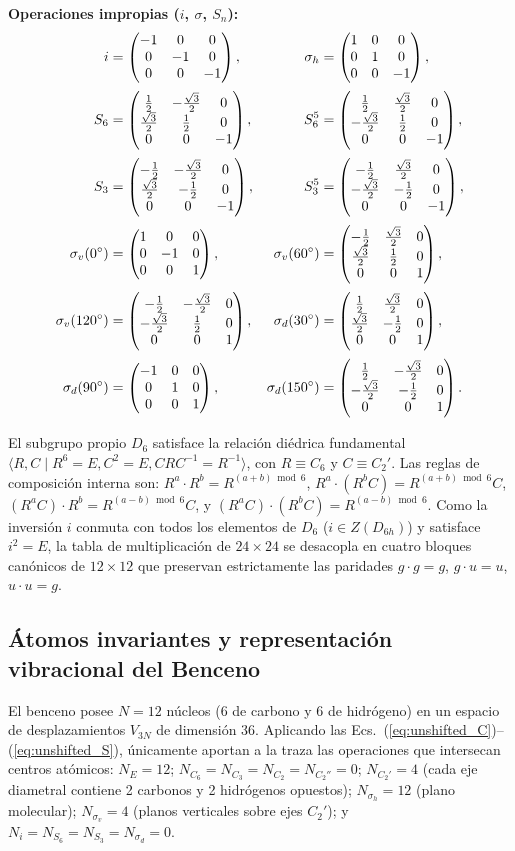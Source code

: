 \noindent\textbf{Operaciones impropias ($i$, $\sigma$, $S_n$):}
\begin{align*}
i &= \begin{pmatrix}-1&0&0\\0&-1&0\\0&0&-1\end{pmatrix}, &
\sigma_h &= \begin{pmatrix}1&0&0\\0&1&0\\0&0&-1\end{pmatrix}, \\[2pt]
S_6 &= \begin{pmatrix}\tfrac{1}{2}&-\tfrac{\sqrt{3}}{2}&0\\\tfrac{\sqrt{3}}{2}&\tfrac{1}{2}&0\\0&0&-1\end{pmatrix}, &
S_6^{5} &= \begin{pmatrix}\tfrac{1}{2}&\tfrac{\sqrt{3}}{2}&0\\-\tfrac{\sqrt{3}}{2}&\tfrac{1}{2}&0\\0&0&-1\end{pmatrix}, \\[2pt]
S_3 &= \begin{pmatrix}-\tfrac{1}{2}&-\tfrac{\sqrt{3}}{2}&0\\\tfrac{\sqrt{3}}{2}&-\tfrac{1}{2}&0\\0&0&-1\end{pmatrix}, &
S_3^{5} &= \begin{pmatrix}-\tfrac{1}{2}&\tfrac{\sqrt{3}}{2}&0\\-\tfrac{\sqrt{3}}{2}&-\tfrac{1}{2}&0\\0&0&-1\end{pmatrix}, \\[2pt]
\sigma_v(0^\circ) &= \begin{pmatrix}1&0&0\\0&-1&0\\0&0&1\end{pmatrix}, &
\sigma_v(60^\circ) &= \begin{pmatrix}-\tfrac{1}{2}&\tfrac{\sqrt{3}}{2}&0\\\tfrac{\sqrt{3}}{2}&\tfrac{1}{2}&0\\0&0&1\end{pmatrix}, \\[2pt]
\sigma_v(120^\circ) &= \begin{pmatrix}-\tfrac{1}{2}&-\tfrac{\sqrt{3}}{2}&0\\-\tfrac{\sqrt{3}}{2}&\tfrac{1}{2}&0\\0&0&1\end{pmatrix}, &
\sigma_d(30^\circ) &= \begin{pmatrix}\tfrac{1}{2}&\tfrac{\sqrt{3}}{2}&0\\\tfrac{\sqrt{3}}{2}&-\tfrac{1}{2}&0\\0&0&1\end{pmatrix}, \\[2pt]
\sigma_d(90^\circ) &= \begin{pmatrix}-1&0&0\\0&1&0\\0&0&1\end{pmatrix}, &
\sigma_d(150^\circ) &= \begin{pmatrix}\tfrac{1}{2}&-\tfrac{\sqrt{3}}{2}&0\\-\tfrac{\sqrt{3}}{2}&-\tfrac{1}{2}&0\\0&0&1\end{pmatrix}.
\end{align*}
\endgroup

El subgrupo propio $D_6$ satisface la relación diédrica fundamental $\langle R, C \mid R^6 = E, C^2 = E, CRC^{-1} = R^{-1} \rangle$, con $R \equiv C_6$ y $C \equiv C_2'$. Las reglas de composición interna son: $R^a \cdot R^b = R^{(a+b)\bmod 6}$, $R^a \cdot (R^b C) = R^{(a+b)\bmod 6} C$, $(R^a C) \cdot R^b = R^{(a-b)\bmod 6} C$, y $(R^a C) \cdot (R^b C) = R^{(a-b)\bmod 6}$. Como la inversión $i$ conmuta con todos los elementos de $D_6$ ($i \in Z(D_{6h})$) y satisface $i^2 = E$, la tabla de multiplicación de $24 \times 24$ se desacopla en cuatro bloques canónicos de $12 \times 12$ que preservan estrictamente las paridades $g \cdot g = g$, $g \cdot u = u$, $u \cdot u = g$.

\subsection{Átomos invariantes y representación vibracional del Benceno}
El benceno posee $N = 12$ núcleos (6 de carbono y 6 de hidrógeno) en un espacio de desplazamientos $V_{3N}$ de dimensión 36. Aplicando las Ecs.~(\ref{eq:unshifted_C})--(\ref{eq:unshifted_S}), únicamente aportan a la traza las operaciones que intersecan centros atómicos:
$N_E = 12$; $N_{C_6} = N_{C_3} = N_{C_2} = N_{C_2''} = 0$; $N_{C_2'} = 4$ (cada eje diametral contiene 2 carbonos y 2 hidrógenos opuestos); $N_{\sigma_h} = 12$ (plano molecular); $N_{\sigma_v} = 4$ (planos verticales sobre ejes $C_2'$); y $N_i = N_{S_6} = N_{S_3} = N_{\sigma_d} = 0$.

